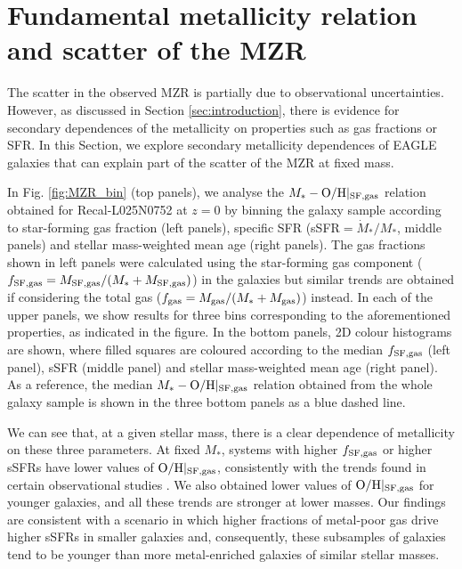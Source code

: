 \documentclass[useAMS,usenatbib]{mn2e}
\begin{document}
\section{Fundamental metallicity relation and scatter of the MZR}
\label{sec:mzr_scatter}

The scatter in the observed MZR is partially due to observational uncertainties.
However, as discussed in Section \ref{sec:introduction}, there is evidence for secondary dependences
of the metallicity on properties such as gas fractions or SFR.
In this Section, we explore secondary metallicity dependences of {\sc EAGLE} galaxies 
that can explain part of the scatter of the MZR at fixed mass.  

In Fig. \ref{fig:MZR_bin} (top panels), we analyse the $M_* - {\rm O/H}|_{\rm SF,gas}$ relation obtained for 
Recal-L025N0752 at $z=0$ by binning
the galaxy sample according to star-forming gas fraction (left panels), specific SFR 
(sSFR$= {\dot M_*} / M_*$, middle panels)
and stellar mass-weighted mean age (right panels). 
The gas fractions shown in left panels were calculated using the star-forming gas component 
($f_{\rm SF,gas} = M_{\rm SF,gas} / (M_* + M_{\rm SF,gas})$) in the galaxies
but similar trends are obtained if considering the total gas ($f_{\rm gas} = M_{\rm gas} / (M_* + M_{\rm gas})$) instead.
In each of the upper panels, we show results for three bins corresponding to the aforementioned
properties, as indicated in the figure.  
In the bottom panels, 2D colour histograms are shown, where
filled squares are coloured according to the median $f_{\rm SF,gas}$ (left panel),
sSFR (middle panel) and stellar mass-weighted mean age (right panel).
As a reference, the median $M_* - {\rm O/H}|_{\rm SF,gas}$ relation obtained from the whole galaxy sample is shown
in the three bottom panels as a blue dashed line.


We can see that, at a given stellar mass, 
there is a clear dependence of metallicity on these three parameters.
At fixed $M_*$, systems with higher $f_{\rm SF,gas}$ or higher sSFRs 
have lower values of ${\rm O/H}|_{\rm SF, gas}$, consistently with the trends found
in certain observational studies \citep[e.g.][]{kewley2008, salim2014, bothwell2013}.
We also obtained lower values of ${\rm O/H}|_{\rm SF, gas}$ for younger galaxies,
and all these trends are stronger at lower masses.
Our findings are consistent with a scenario in which higher fractions of metal-poor gas drive 
higher sSFRs in smaller galaxies and, consequently, these subsamples of galaxies tend to be younger 
than more metal-enriched galaxies of similar stellar masses.
\end{document}
